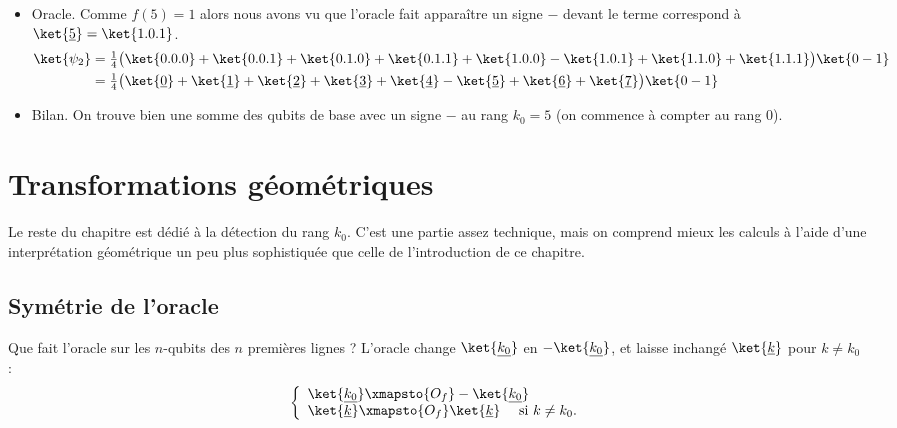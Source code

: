 \documentclass[11pt,class=report,crop=false]{standalone}
\begin{document}
\begin{exemple}
\begin{itemize}
	
	\item Oracle.
	Comme $f(5)=1$ alors nous avons vu que l'oracle fait apparaître un signe \og{}$-$\fg{} devant le terme correspond à $\ket{\underline{5}} = \ket{1.0.1}$. 
	\begin{align*}
		\ket{\psi_2} 
		&= \tfrac{1}{4} \big( \ket{0.0.0} + \ket{0.0.1} + \ket{0.1.0} + \ket{0.1.1} 
		+  \ket{1.0.0} - \ket{1.0.1} + \ket{1.1.0} + \ket{1.1.1}\big)\ket{0-1} \\
        &= \tfrac{1}{4} \big( \ket{\underline0} +  \ket{\underline1} + \ket{\underline2} + \ket{\underline3} + \ket{\underline4} - \ket{\underline5} + \ket{\underline6} + \ket{\underline7}\big)\ket{0-1} \\
	\end{align*}  
	
	
	\item Bilan. On trouve bien une somme des qubits de base avec un signe \og{}$-$\fg{} au rang $k_0=5$ (on commence à compter au rang $0$).
	
\end{itemize}
\end{exemple}

\section{Transformations géométriques}

Le reste du chapitre est dédié à la détection du rang $k_0$. C'est une partie assez technique, mais on comprend mieux les calculs à l'aide d'une interprétation géométrique un peu plus sophistiquée que celle de l'introduction de ce chapitre.

\subsection{Symétrie de l'oracle}

Que fait l'oracle sur les $n$-qubits des $n$ premières lignes ?
L'oracle change $\ket{\underline{k_0}}$ en  $-\ket{\underline{k_0}}$, et laisse inchangé 
 $\ket{\underline{k}}$ pour $k\neq k_0$ :
$$\left\{
\begin{array}{l}
\ket{\underline{k_0}} \xmapsto{O_f} -\ket{\underline{k_0}} \\
\ket{\underline{k}}  \xmapsto{O_f} \ket{\underline{k}} \quad \text{ si } k\neq k_0. \\
\end{array}
\right.$$
\end{document}
